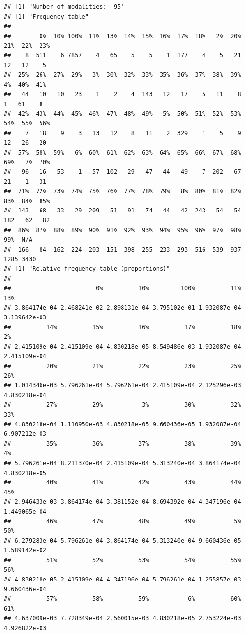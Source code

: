 \begin{verbatim}
## [1] "Number of modalities:  95"
## [1] "Frequency table"
## 
##        0%  10% 100%  11%  13%  14%  15%  16%  17%  18%   2%  20%  21%  22%  23% 
##    8  511    6 7857    4   65    5    5    1  177    4    5   21   12   12    5 
##  25%  26%  27%  29%   3%  30%  32%  33%  35%  36%  37%  38%  39%   4%  40%  41% 
##   44   10   10   23    1    2    4  143   12   17    5   11    8    1   61    8 
##  42%  43%  44%  45%  46%  47%  48%  49%   5%  50%  51%  52%  53%  54%  55%  56% 
##    7   18    9    3   13   12    8   11    2  329    1    5    9   12   26   20 
##  57%  58%  59%   6%  60%  61%  62%  63%  64%  65%  66%  67%  68%  69%   7%  70% 
##   96   16   53    1   57  102   29   47   44   49    7  202   67   21    1   31 
##  71%  72%  73%  74%  75%  76%  77%  78%  79%   8%  80%  81%  82%  83%  84%  85% 
##  143   68   33   29  209   51   91   74   44   42  243   54   54  182   62   82 
##  86%  87%  88%  89%  90%  91%  92%  93%  94%  95%  96%  97%  98%  99%  N/A 
##  166   84  162  224  203  151  398  255  233  293  516  539  937 1285 3430 
## [1] "Relative frequency table (proportions)"
## 
##                        0%          10%         100%          11%          13% 
## 3.864174e-04 2.468241e-02 2.898131e-04 3.795102e-01 1.932087e-04 3.139642e-03 
##          14%          15%          16%          17%          18%           2% 
## 2.415109e-04 2.415109e-04 4.830218e-05 8.549486e-03 1.932087e-04 2.415109e-04 
##          20%          21%          22%          23%          25%          26% 
## 1.014346e-03 5.796261e-04 5.796261e-04 2.415109e-04 2.125296e-03 4.830218e-04 
##          27%          29%           3%          30%          32%          33% 
## 4.830218e-04 1.110950e-03 4.830218e-05 9.660436e-05 1.932087e-04 6.907212e-03 
##          35%          36%          37%          38%          39%           4% 
## 5.796261e-04 8.211370e-04 2.415109e-04 5.313240e-04 3.864174e-04 4.830218e-05 
##          40%          41%          42%          43%          44%          45% 
## 2.946433e-03 3.864174e-04 3.381152e-04 8.694392e-04 4.347196e-04 1.449065e-04 
##          46%          47%          48%          49%           5%          50% 
## 6.279283e-04 5.796261e-04 3.864174e-04 5.313240e-04 9.660436e-05 1.589142e-02 
##          51%          52%          53%          54%          55%          56% 
## 4.830218e-05 2.415109e-04 4.347196e-04 5.796261e-04 1.255857e-03 9.660436e-04 
##          57%          58%          59%           6%          60%          61% 
## 4.637009e-03 7.728349e-04 2.560015e-03 4.830218e-05 2.753224e-03 4.926822e-03 

\end{verbatim}
